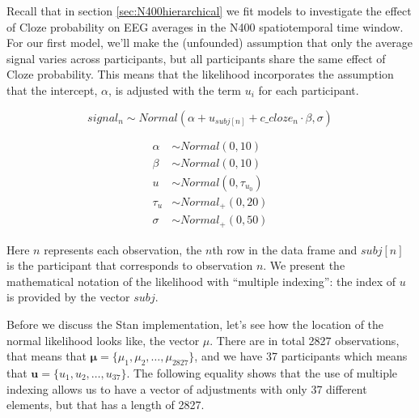 \documentclass[12pt,]{krantz}
\theoremstyle{definition}
\theoremstyle{definition}
\theoremstyle{definition}
\theoremstyle{remark}
\begin{document}
Recall that in section \ref{sec:N400hierarchical} we fit models to
investigate the effect of Cloze probability on EEG averages in the N400
spatiotemporal time window. For our first model, we'll make the
(unfounded) assumption that only the average signal varies across
participants, but all participants share the same effect of Cloze
probability. This means that the likelihood incorporates the assumption
that the intercept, \(\alpha\), is adjusted with the term \(u_i\) for
each participant.

\begin{equation}
  signal_n \sim Normal(\alpha + u_{subj[n]} + c\_cloze_n \cdot \beta,\sigma)
\end{equation}

\begin{equation}
 \begin{aligned}
 \alpha &\sim Normal(0,10)\\
 \beta  &\sim Normal(0,10)\\
 u &\sim Normal(0,\tau_{u_0})\\
 \tau_{u} &\sim Normal_+(0,20) \\
 \sigma  &\sim Normal_+(0,50)
 \end{aligned}
 \end{equation}

Here \(n\) represents each observation, the \(n\)th row in the data
frame and \(subj[n]\) is the participant that corresponds to observation
\(n\). We present the mathematical notation of the likelihood with
``multiple indexing'': the index of \(u\) is provided by the vector
\(subj\).

Before we discuss the Stan implementation, let's see how the location of
the normal likelihood looks like, the vector \(\mu\). There are in total
2827 observations, that means that
\(\boldsymbol{\mu}=\{\mu_1,\mu_2, \ldots, \mu_{2827}\}\), and we have 37
participants which means that
\(\boldsymbol{u}=\{u_1,u_2, \ldots, u_{37}\}\). The following equality
shows that the use of multiple indexing allows us to have a vector of
adjustments with only 37 different elements, but that has a length of
2827.
\end{document}
